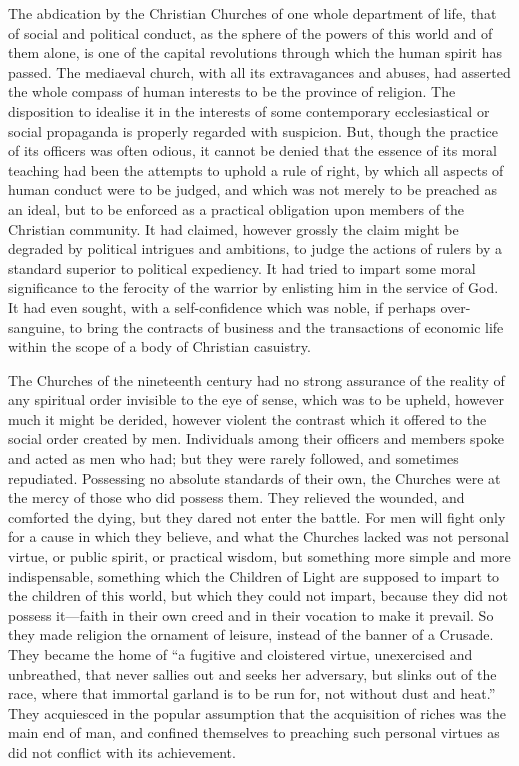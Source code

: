 \documentclass{book}
\begin{document}
The abdication by the Christian Churches of one whole department of life, that of social and political conduct, as the sphere of the powers of this world and of them alone, is one of the capital revolutions through which the human spirit has passed. The mediaeval church, with all its extravagances and abuses, had asserted the whole compass of human interests to be the province of religion. The disposition to idealise it in the interests of some contemporary ecclesiastical or social propaganda is properly regarded with suspicion. But, though the practice of its officers was often odious, it cannot be denied that the essence of its moral teaching had been the attempts to uphold a rule of right, by which all aspects of human conduct were to be judged, and which was not merely to be preached as an ideal, but to be enforced as a practical obligation upon members of the Christian community. It had claimed, however grossly the claim might be degraded by political intrigues and ambitions, to judge the actions of rulers by a standard superior to political expediency. It had tried to impart some moral significance to the ferocity of the warrior by enlisting him in the service of God. It had even sought, with a self-confidence which was noble, if perhaps over-sanguine, to bring the contracts of business and the transactions of economic life within the scope of a body of Christian casuistry.

The Churches of the nineteenth century had no strong assurance of the reality of any spiritual order invisible to the eye of sense, which was to be upheld, however much it might be derided, however violent the contrast which it offered to the social order created by men. Individuals among their officers and members spoke and acted as men who had; but they were rarely followed, and sometimes repudiated. Possessing no absolute standards of their own, the Churches were at the mercy of those who did possess them. They relieved the wounded, and comforted the dying, but they dared not enter the battle. For men will fight only for a cause in which they believe, and what the Churches lacked was not personal virtue, or public spirit, or practical wisdom, but something more simple and more indispensable, something which the Children of Light are supposed to impart to the children of this world, but which they could not impart, because they did not possess it—faith in their own creed and in their vocation to make it prevail. So they made religion the ornament of leisure, instead of the banner of a Crusade. They became the home of “a fugitive and cloistered virtue, unexercised and unbreathed, that never sallies out and seeks her adversary, but slinks out of the race, where that immortal garland is to be run for, not without dust and heat.” They acquiesced in the popular assumption that the acquisition of riches was the main end of man, and confined themselves to preaching such personal virtues as did not conflict with its achievement.
\end{document}
